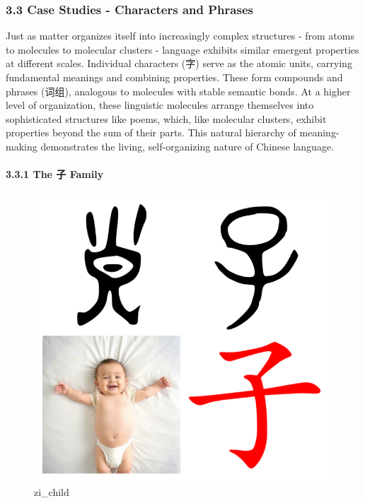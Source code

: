 \hypertarget{case-studies---characters-and-phrases}{%
\subsubsection{3.3 Case Studies - Characters and
Phrases}\label{case-studies---characters-and-phrases}}

Just as matter organizes itself into increasingly complex structures -
from atoms to molecules to molecular clusters - language exhibits
similar emergent properties at different scales. Individual characters
(字) serve as the atomic units, carrying fundamental meanings and
combining properties. These form compounds and phrases (词组), analogous
to molecules with stable semantic bonds. At a higher level of
organization, these linguistic molecules arrange themselves into
sophisticated structures like poems, which, like molecular clusters,
exhibit properties beyond the sum of their parts. This natural hierarchy
of meaning-making demonstrates the living, self-organizing nature of
Chinese language.

\hypertarget{the-ux5b50-family}{%
\paragraph{3.3.1 The 子 Family}\label{the-ux5b50-family}}

\begin{figure}
\centering
\includegraphics{./images/zi_child.png}
\caption{zi\_child}
\end{figure}

